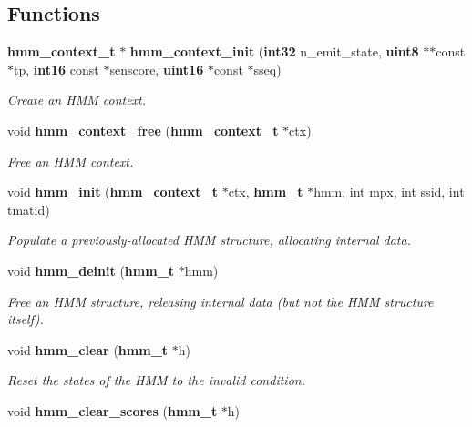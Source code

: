\subsection*{\-Functions}
\begin{DoxyCompactItemize}
\item 
{\bf hmm\-\_\-context\-\_\-t} $\ast$ {\bf hmm\-\_\-context\-\_\-init} ({\bf int32} n\-\_\-emit\-\_\-state, {\bf uint8} $\ast$$\ast$const $\ast$tp, {\bf int16} const $\ast$senscore, {\bf uint16} $\ast$const $\ast$sseq)\label{hmm_8h_a4d6e2799cbe290112e8517adcab1b038}

\begin{DoxyCompactList}\small\item\em \-Create an \-H\-M\-M context. \end{DoxyCompactList}\item 
void {\bf hmm\-\_\-context\-\_\-free} ({\bf hmm\-\_\-context\-\_\-t} $\ast$ctx)
\begin{DoxyCompactList}\small\item\em \-Free an \-H\-M\-M context. \end{DoxyCompactList}\item 
void {\bf hmm\-\_\-init} ({\bf hmm\-\_\-context\-\_\-t} $\ast$ctx, {\bf hmm\-\_\-t} $\ast$hmm, int mpx, int ssid, int tmatid)\label{hmm_8h_aa911ae0d1c0eba562692fbeebca90d78}

\begin{DoxyCompactList}\small\item\em \-Populate a previously-\/allocated \-H\-M\-M structure, allocating internal data. \end{DoxyCompactList}\item 
void {\bf hmm\-\_\-deinit} ({\bf hmm\-\_\-t} $\ast$hmm)\label{hmm_8h_a7440ced1649225beb6816bf62481e08b}

\begin{DoxyCompactList}\small\item\em \-Free an \-H\-M\-M structure, releasing internal data (but not the \-H\-M\-M structure itself). \end{DoxyCompactList}\item 
void {\bf hmm\-\_\-clear} ({\bf hmm\-\_\-t} $\ast$h)
\begin{DoxyCompactList}\small\item\em \-Reset the states of the \-H\-M\-M to the invalid condition. \end{DoxyCompactList}\item 
void {\bf hmm\-\_\-clear\-\_\-scores} ({\bf hmm\-\_\-t} $\ast$h)\label{hmm_8h_a9561d7ffa1e61c99de2d2b900774152f}


\end{DoxyCompactItemize}
